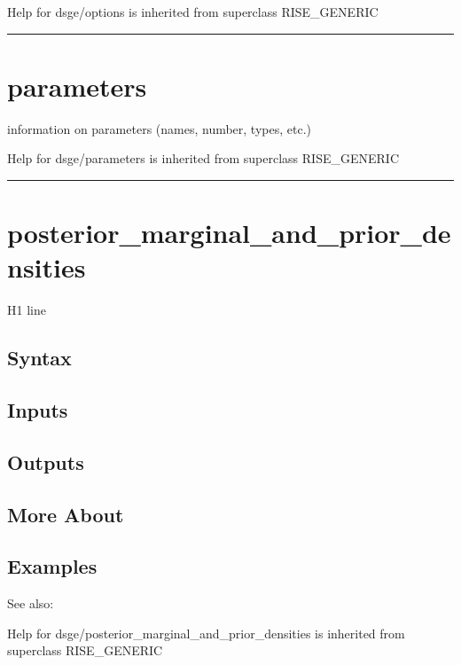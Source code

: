 \documentclass[letterpaper,10pt,english]{sphinxmanual}
\begin{document}
Help for dsge/options is inherited from superclass RISE\_GENERIC


\bigskip\hrule{}\bigskip



\section{parameters}
\label{classes/models/@dsge/dsge:id129}\label{classes/models/@dsge/dsge:parameters}
information on parameters (names, number, types, etc.)

Help for dsge/parameters is inherited from superclass RISE\_GENERIC


\bigskip\hrule{}\bigskip



\section{posterior\_marginal\_and\_prior\_densities}
\label{classes/models/@dsge/dsge:id130}\label{classes/models/@dsge/dsge:posterior-marginal-and-prior-densities}
H1 line


\subsection{Syntax}
\label{classes/models/@dsge/dsge:id131}

\subsection{Inputs}
\label{classes/models/@dsge/dsge:id132}

\subsection{Outputs}
\label{classes/models/@dsge/dsge:id133}

\subsection{More About}
\label{classes/models/@dsge/dsge:id134}

\subsection{Examples}
\label{classes/models/@dsge/dsge:id135}
See also:

Help for dsge/posterior\_marginal\_and\_prior\_densities is inherited from superclass RISE\_GENERIC
\end{document}
